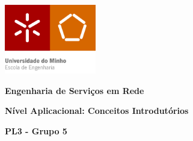 \documentclass[a4paper, 11pt]{article}
\begin{document}
\begin{titlepage}
    \begin{center}

    	\includegraphics[width=0.3\textwidth]{images/Capa/EEUMfinal .png}
       
       \vspace*{1cm}
       
       \textbf{\Large Engenharia de Serviços em Rede}
        \vspace{1cm}
        \par
        \textbf{\Large Nível Aplicacional: Conceitos Introdutórios }
        \vspace{1cm}
        \par
        \Large \textbf{PL3 - Grupo 5}
        

\end{center}
\end{titlepage}
\end{document}
